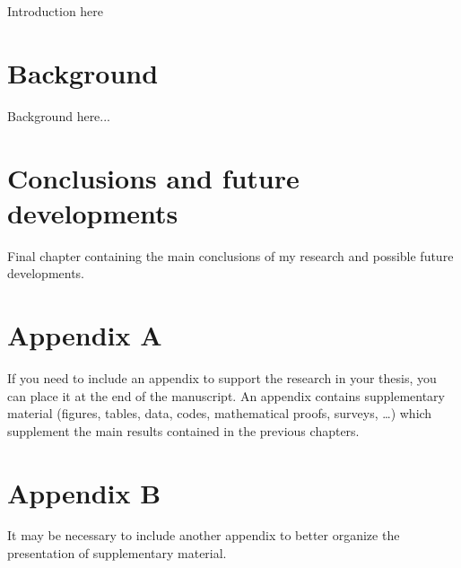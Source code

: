 \documentclass{Configuration_Files/PoliMi3i_thesis}
\begin{document}
    Introduction here



    \chapter{Background}
    \label{ch:chapter_one}%

    Background here...


    \chapter{Conclusions and future developments}
    \label{ch:conclusions}%
    Final chapter containing the main conclusions of my research
    and possible future developments.




    \cleardoublepage
    \appendix


    \chapter{Appendix A}
    If you need to include an appendix to support the research in your thesis, you can place it at the end of the manuscript.
    An appendix contains supplementary material (figures, tables, data, codes, mathematical proofs, surveys, \dots)
    which supplement the main results contained in the previous chapters.


    \chapter{Appendix B}
    It may be necessary to include another appendix to better organize the presentation of supplementary material.
\end{document}

